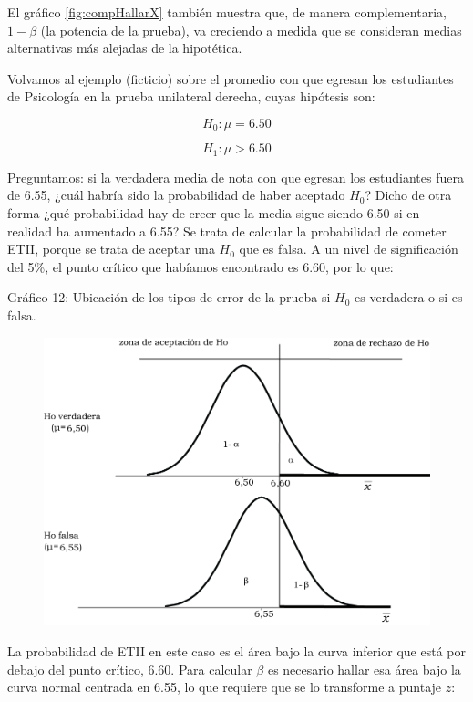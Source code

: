 \documentclass[]{book}
\begin{document}
El gráfico \ref{fig:compHallarX} también muestra que, de manera complementaria, \(1-\beta\) (la potencia de la prueba), va creciendo a medida que se consideran medias
alternativas más alejadas de la hipotética.

Volvamos al ejemplo (ficticio) sobre el promedio con que egresan los
estudiantes de Psicología en la prueba unilateral derecha, cuyas
hipótesis son:

\[H_{0}:\mu = 6.50\]

\[H_{1}:\mu > 6.50\]

Preguntamos: si la verdadera media de nota con que egresan los
estudiantes fuera de 6.55, ¿cuál habría sido la probabilidad de haber
aceptado \(H_{0}\)? Dicho de otra forma ¿qué probabilidad hay de creer que la media sigue siendo 6.50 si en realidad ha aumentado a 6.55? Se trata de calcular la probabilidad de cometer ETII, porque se trata de aceptar una \(H_{0}\) que es falsa. A un nivel de significación del 5\%, el punto crítico que habíamos encontrado es 6.60, por lo que:

Gráfico 12: Ubicación de los tipos de error de la prueba si \(H_{0}\) es
verdadera o si es falsa.

\begin{figure}

{\centering \includegraphics[width=14.08in]{imagenes/image189} 

}

\end{figure}

La probabilidad de ETII en este caso es el área bajo la curva inferior
que está por debajo del punto crítico, 6.60. Para calcular \(\beta\) es
necesario hallar esa área bajo la curva normal centrada en 6.55, lo que
requiere que se lo transforme a puntaje \(z\):
\end{document}
